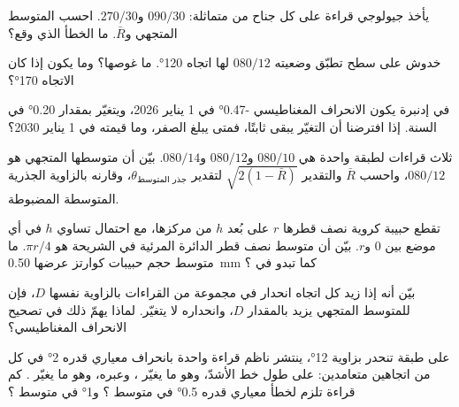 \begin{exercise}[$\star\star$]\label{exo:b1:field-lab-methods-1:6}
يأخذ جيولوجي قراءة على كل جناح من  متماثلة: $090/30$ و$270/30$. احسب المتوسط المتجهي و$\bar R$. ما الخطأ الذي وقع؟
\end{exercise}

\begin{exercise}[$\star\star$]\label{exo:b1:field-lab-methods-1:7}
خدوش على سطح تطبّق وضعيته $080/12$ لها اتجاه \ang{120}. ما غوصها؟ وما يكون إذا كان الاتجاه \ang{170}؟
\end{exercise}

\begin{exercise}[$\star\star$]\label{exo:b1:field-lab-methods-1:8}
في إدنبرة يكون الانحراف المغناطيسي \ang{-0.47} في 1 يناير 2026، ويتغيّر بمقدار \ang{+0.20} في السنة. إذا افترضنا أن التغيّر يبقى ثابتًا، فمتى يبلغ الصفر، وما قيمته في 1 يناير 2030؟
\end{exercise}

\begin{exercise}[$\star\star$]\label{exo:b1:field-lab-methods-1:9}
ثلاث قراءات لطبقة واحدة هي $080/10$ و$080/12$ و$080/14$. بيّن أن متوسطها المتجهي هو $080/12$، واحسب $\bar R$ والتقدير $\sqrt{2(1 - \bar R)}$ لتقدير $\theta_{\text{جذر المتوسط}}$، وقارنه بالزاوية الجذرية المتوسطة المضبوطة.
\end{exercise}

\begin{exercise}[$\star\star\star$]\label{exo:b1:field-lab-methods-1:10}
تقطع  حبيبة كروية نصف قطرها $r$ على بُعد $h$ من مركزها، مع احتمال تساوي $h$ في أي موضع بين 0 و$r$. بيّن أن متوسط نصف قطر الدائرة المرئية في الشريحة هو $\pi r/4$. ما متوسط حجم حبيبات كوارتز عرضها \qty{0.50}{mm} كما تبدو في ؟
\end{exercise}

\begin{exercise}[$\star\star\star$]\label{exo:b1:field-lab-methods-1:11}
بيّن أنه إذا زيد كل اتجاه انحدار في مجموعة من القراءات بالزاوية نفسها $D$، فإن  للمتوسط المتجهي يزيد بالمقدار $D$، وانحداره لا يتغيّر. لماذا يهمّ ذلك في تصحيح الانحراف المغناطيسي؟
\end{exercise}

\begin{exercise}[$\star\star\star$]\label{exo:b1:field-lab-methods-1:12}
على طبقة تنحدر بزاوية \ang{12}، ينتشر ناظم قراءة واحدة بانحراف معياري قدره \ang{2} في كل من اتجاهين متعامدين: على طول خط  الأشدّ، وهو ما يغيّر ، وعبره، وهو ما يغيّر . كم قراءة تلزم لخطأ معياري قدره \ang{0.5} في متوسط ؟ و\ang{1} في متوسط ؟
\end{exercise}

